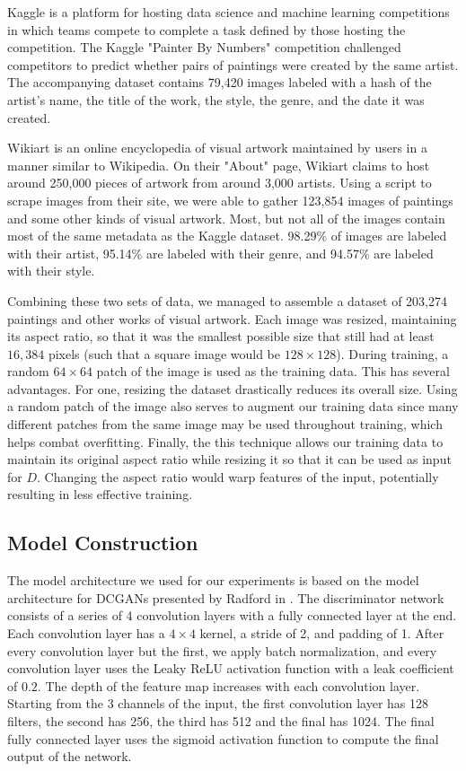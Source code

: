 \documentclass[10pt,twocolumn,letterpaper]{article}
\begin{document}
Kaggle is a platform for hosting data science and machine learning competitions in which teams compete to complete a task defined by those hosting the competition. The Kaggle "Painter By Numbers" competition challenged competitors to predict whether pairs of paintings were created by the same artist. The accompanying dataset contains 79,420 images labeled with a hash of the artist's name, the title of the work, the style, the genre, and the date it was created.

Wikiart is an online encyclopedia of visual artwork maintained by users in a manner similar to Wikipedia. On their "About" page, Wikiart claims to host around 250,000 pieces of artwork from around 3,000 artists. Using a script to scrape images from their site, we were able to gather 123,854 images of paintings and some other kinds of visual artwork. Most, but not all of the images contain most of the same metadata as the Kaggle dataset. 98.29\% of images are labeled with their artist, 95.14\% are labeled with their genre, and 94.57\% are labeled with their style.

Combining these two sets of data, we managed to assemble a dataset of 203,274 paintings and other works of visual artwork. Each image was resized, maintaining its aspect ratio, so that it was the smallest possible size that still had at least $ 16,384 $ pixels (such that a square image would be $ 128 \times 128 $). During training, a random $ 64 \times 64 $ patch of the image is used as the training data. This has several advantages. For one, resizing the dataset drastically reduces its overall size. Using a random patch of the image also serves to augment our training data since many different patches from the same image may be used throughout training, which helps combat overfitting. Finally, the this technique allows our training data to maintain its original aspect ratio while resizing it so that it can be used as input for $ D $. Changing the aspect ratio would warp features of the input, potentially resulting in less effective training.

\subsection{Model Construction}
The model architecture we used for our experiments is based on the model architecture for DCGANs presented by Radford \etal in \cite{radford2015unsupervised}. The discriminator network consists of a series of 4 convolution layers with a fully connected layer at the end. Each convolution layer has a $ 4 \times 4 $ kernel, a stride of 2, and padding of 1. After every convolution layer but the first, we apply batch normalization, and every convolution layer uses the Leaky ReLU activation function \cite{maas2013rectifier} with a leak coefficient of $ 0.2 $. The depth of the feature map increases with each convolution layer. Starting from the 3 channels of the input, the first convolution layer has 128 filters, the second has 256, the third has 512 and the final has 1024. The final fully connected layer uses the sigmoid activation function to compute the final output of the network.
\end{document}
